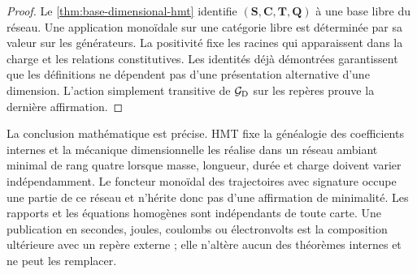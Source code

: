 \begin{proof}
Le \cref{thm:base-dimensional-hmt} identifie
\((\mathbf S,\mathbf C,\mathbf T,\mathbf Q)\) à une base libre du
réseau. Une application monoïdale sur une catégorie libre est déterminée
par sa valeur sur les générateurs. La positivité fixe les racines qui apparaissent
dans la charge et les relations constitutives. Les identités déjà démontrées garantissent que les
définitions ne dépendent pas d'une présentation alternative d'une dimension.
L'action simplement transitive de \(\mathcal G_{\rm D}\) sur les repères
prouve la dernière affirmation.
\end{proof}

La conclusion mathématique est précise. HMT fixe la généalogie des
coefficients internes et la mécanique dimensionnelle les réalise dans un réseau
ambiant minimal de rang quatre lorsque masse, longueur, durée et charge doivent
varier indépendamment. Le foncteur monoïdal des trajectoires avec signature
occupe une partie de ce réseau et n'hérite donc pas d'une affirmation de
minimalité. Les rapports et les équations homogènes sont indépendants de
toute carte. Une publication en secondes, joules, coulombs ou
électronvolts est la composition ultérieure avec un repère externe ; elle n'altère
aucun des théorèmes internes et ne peut les remplacer.
